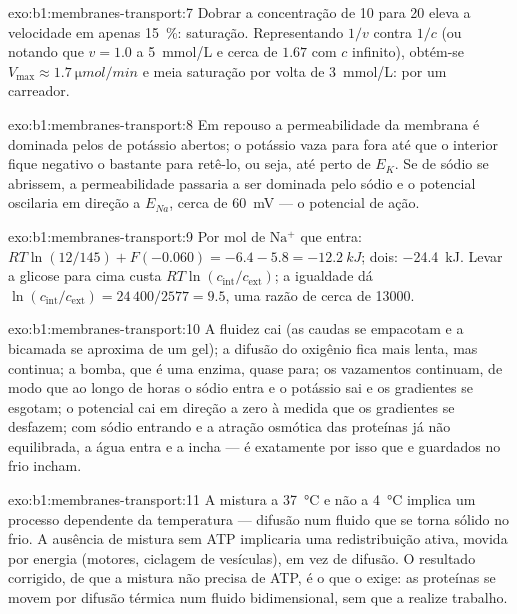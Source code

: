 \begin{solution}{exo:b1:membranes-transport:7}
Dobrar a concentração de 10 para 20 eleva a velocidade em apenas
\qty{15}{\%}: saturação. Representando $1/v$ contra $1/c$ (ou notando
que $v = 1.0$ a \qty{5}{mmol/L} e cerca de $1.67$ com $c$ infinito),
obtém-se $V_{\max} \approx \qty{1.7}{\micro mol/min}$ e meia saturação
por volta de \qty{3}{mmol/L}:  por um carreador.
\end{solution}

\begin{solution}{exo:b1:membranes-transport:8}
Em repouso a permeabilidade da membrana é dominada pelos  de
potássio abertos; o potássio vaza para fora até que o interior fique
negativo o bastante para retê-lo, ou seja, até perto de $E_K$. Se 
de sódio se abrissem, a permeabilidade passaria a ser dominada pelo
sódio e o potencial oscilaria em direção a $E_{Na}$, cerca de
\qty{+60}{mV} --- o potencial de ação.
\end{solution}

\begin{solution}{exo:b1:membranes-transport:9}
Por mol de $\mathrm{Na^+}$ que entra: $RT\ln(12/145) + F(-0.060) = -6.4 - 5.8
= \qty{-12.2}{kJ}$; dois: \qty{-24.4}{kJ}. Levar a glicose para cima
custa $RT\ln(c_{\text{int}}/c_{\text{ext}})$; a igualdade dá
$\ln(c_{\text{int}}/c_{\text{ext}}) = 24\,400/2577 = 9.5$, uma razão de
cerca de \num{13000}.
\end{solution}

\begin{solution}{exo:b1:membranes-transport:10}
A fluidez cai (as caudas se empacotam e a bicamada se aproxima de um
gel); a difusão do oxigênio fica mais lenta, mas continua; a bomba, que
é uma enzima, quase para; os vazamentos continuam, de modo que ao longo
de horas o sódio entra e o potássio sai e os gradientes se esgotam; o
potencial cai em direção a zero à medida que os gradientes se desfazem;
com sódio entrando e a atração osmótica das proteínas já não
equilibrada, a água entra e a  incha --- é exatamente por isso que
 e  guardados no frio incham.
\end{solution}

\begin{solution}{exo:b1:membranes-transport:11}
A mistura a \qty{37}{\celsius} e não a \qty{4}{\celsius} implica um
processo dependente da temperatura --- difusão num fluido que se torna
sólido no frio. A ausência de mistura sem ATP implicaria uma
redistribuição ativa, movida por energia (motores, ciclagem de
vesículas), em vez de difusão. O resultado corrigido, de que a mistura
não precisa de ATP, é o que o  exige: as
proteínas se movem por difusão térmica num fluido bidimensional, sem
que a  realize trabalho.
\end{solution}

